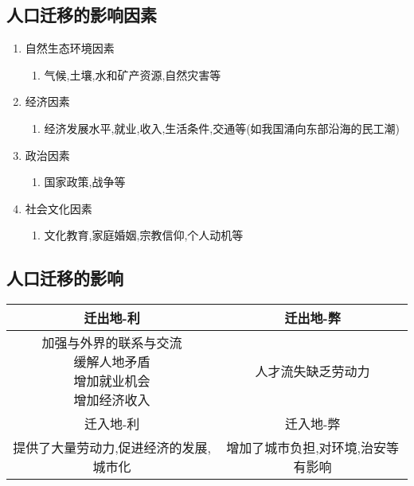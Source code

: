\documentclass[a4paper]{article}
\begin{document}
    \subsection{人口迁移的影响因素}
    \begin{enumerate}
        \item 自然生态环境因素
        \begin{enumerate}
            \item 气候,土壤,水和矿产资源,自然灾害等
        \end{enumerate}
        \item 经济因素
        \begin{enumerate}
            \item 经济发展水平,就业,收入,生活条件,交通等(如我国涌向东部沿海的民工潮)
        \end{enumerate}
        \item 政治因素
        \begin{enumerate}
            \item 国家政策,战争等
        \end{enumerate}
        \item 社会文化因素
        \begin{enumerate}
            \item 文化教育,家庭婚姻,宗教信仰,个人动机等
        \end{enumerate}
    \end{enumerate}
    \subsection{人口迁移的影响}
        \begin{tabular}{|c|c|}
            \hline
            迁出地-利 & 迁出地-弊 \\
            \hline
            \makecell[l]{加强与外界的联系与交流\\ 缓解人地矛盾\\增加就业机会\\增加经济收入} &  人才流失缺乏劳动力 \\
            \hline
            迁入地-利 & 迁入地-弊 \\
            \hline
            提供了大量劳动力,促进经济的发展,城市化 &   增加了城市负担,对环境,治安等有影响 \\
            \hline
        \end{tabular}
\end{document}
